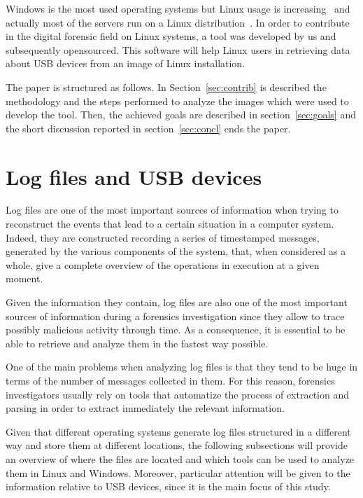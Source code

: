 \documentclass[a4paper]{article}
\begin{document}
Windows is the most used operating systems but Linux usage is
increasing~\cite{osShare} and actually most of the servers run on a Linux
distribution~\cite{InternetServer}. In order to contribute in the digital
forensic field on Linux systems, a tool was developed by us and subsequently
opensourced. This software will help Linux users in retrieving data about USB
devices from an image of Linux installation.

The paper is structured as follows. In Section~\ref{sec:contrib} is described
the methodology and the steps performed to analyze the images which were used to
develop the tool. Then, the achieved goals are described in
section~\ref{sec:goals} and the short discussion reported in
section~\ref{sec:concl} ends the paper.

\section{Log files and USB devices}
\label{sec:lit}
Log files are one of the most important sources of information when trying to
reconstruct the events that lead to a certain situation in a computer system.
Indeed, they are constructed recording a series of timestamped messages,
generated by the various components of the system, that, when considered as a
whole, give a complete overview of the operations in execution at a given
moment.

Given the information they contain, log files are also one of the most important
sources of information during a forensics investigation since they allow to
trace possibly malicious activity through time. As a consequence, it is
essential to be able to retrieve and analyze them in the fastest way
possible.~\cite{finlayson1987log}

One of the main problems when analyzing log files is that they tend to be huge
in terms of the number of messages collected in them. For this reason, forensics
investigators usually rely on tools that automatize the process of extraction
and parsing in order to extract immediately the relevant information.

Given that different operating systems generate log files structured in a
different way and store them at different locations, the following subsections
will provide an overview of where the files are located and which tools can
be used to analyze them in Linux and Windows. Moreover, particular attention
will be given to the information relative to USB devices, since it is the main
focus of this study.
\end{document}
